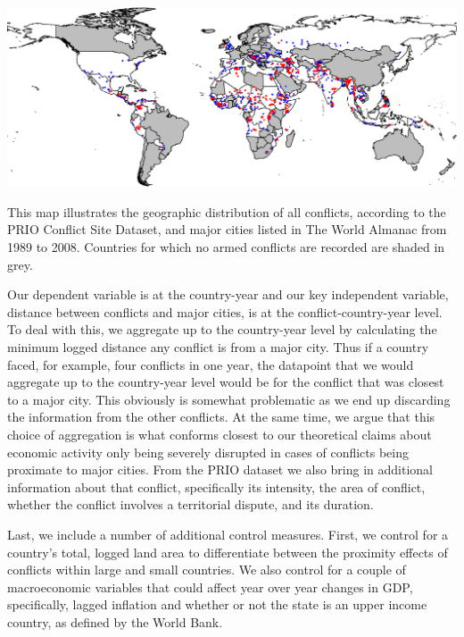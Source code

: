 \begin{amssidewaysfigure}
	\centering
	\includegraphics[width=1\textwidth]{CityConfMap-crop}
	\caption{This map illustrates the geographic distribution of all conflicts, according to the PRIO Conflict Site Dataset, and major cities listed in The World Almanac from 1989 to 2008. Countries for which no armed conflicts are recorded are shaded in grey.}
	\label{fig:CityConfMap}
\end{amssidewaysfigure}
\FloatBarrier

Our dependent variable is at the country-year and our key independent variable, distance between conflicts and major cities, is at the conflict-country-year level. To deal with this, we aggregate up to the country-year level by calculating the minimum logged distance any conflict is from a major city. Thus if a country faced, for example, four conflicts in one year, the datapoint that we would aggregate up to the country-year level would be for the conflict that was closest to a major city. This obviously is somewhat problematic as we end up discarding the information from the other conflicts. At the same time, we argue that this choice of aggregation is what conforms closest to our theoretical claims about economic activity only being severely disrupted in cases of conflicts being proximate to major cities. From the PRIO dataset we also bring in additional information about that conflict, specifically its intensity, the area of conflict, whether the conflict involves a territorial dispute, and its duration.

Last, we include a number of additional control measures. First, we control for a country's total, logged land area to differentiate between the proximity effects of conflicts within large and small countries. We also control for a couple of macroeconomic variables that could affect year over year changes in GDP, specifically, lagged inflation and whether or not the state is an upper income country, as defined by the World Bank.

